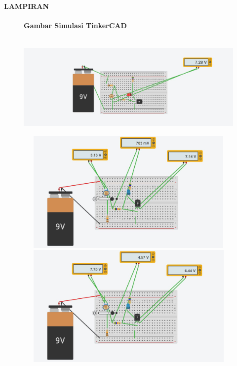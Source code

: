 \documentclass[12pt,a4paper]{article}
\begin{document}
\newpage
\begin{center}
\large{\textbf{LAMPIRAN}}
\end{center}

\newpage
\begin{figure}
\paragraph{Gambar Simulasi TinkerCAD}
\paragraph{ }
\begin{center}

\includegraphics[width=12cm, height=5cm]{g11.png}

\includegraphics[width=12cm, height=6cm]{g12.png}

\includegraphics[width=12cm, height=6cm]{g13.png}
\end{center}
\end{figure}
\vspace{2cm}
\end{document}
